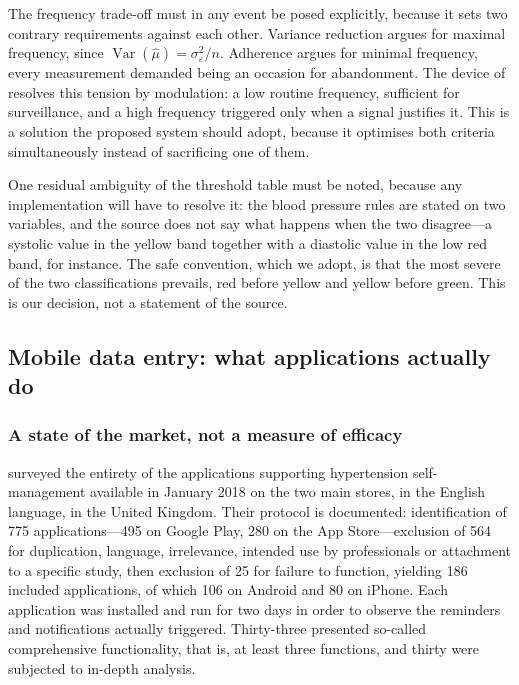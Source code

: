 \documentclass[12pt,a4paper,oneside]{report}
\begin{document}
The frequency trade-off must in any event be posed explicitly, because it sets two contrary requirements against each other. Variance reduction argues for maximal frequency, since $\operatorname{Var}(\hat\mu) = \sigma_\varepsilon^2 / n$. Adherence argues for minimal frequency, every measurement demanded being an occasion for abandonment. The device of \textcite{mihevc2025} resolves this tension by modulation: a low routine frequency, sufficient for surveillance, and a high frequency triggered only when a signal justifies it. This is a solution the proposed system should adopt, because it optimises both criteria simultaneously instead of sacrificing one of them.

One residual ambiguity of the threshold table must be noted, because any implementation will have to resolve it: the blood pressure rules are stated on two variables, and the source does not say what happens when the two disagree---a systolic value in the yellow band together with a diastolic value in the low red band, for instance. The safe convention, which we adopt, is that the most severe of the two classifications prevails, red before yellow and yellow before green. This is our decision, not a statement of the source.

\subsection{Mobile data entry: what applications actually do}\label{sec:apps}

\subsubsection{A state of the market, not a measure of efficacy}

\textcite{alessa2019} surveyed the entirety of the applications supporting hypertension self-management available in January 2018 on the two main stores, in the English language, in the United Kingdom. Their protocol is documented: identification of 775 applications---495 on Google Play, 280 on the App Store---exclusion of 564 for duplication, language, irrelevance, intended use by professionals or attachment to a specific study, then exclusion of 25 for failure to function, yielding 186 included applications, of which 106 on Android and 80 on iPhone. Each application was installed and run for two days in order to observe the reminders and notifications actually triggered. Thirty-three presented so-called comprehensive functionality, that is, at least three functions, and thirty were subjected to in-depth analysis.
\end{document}
